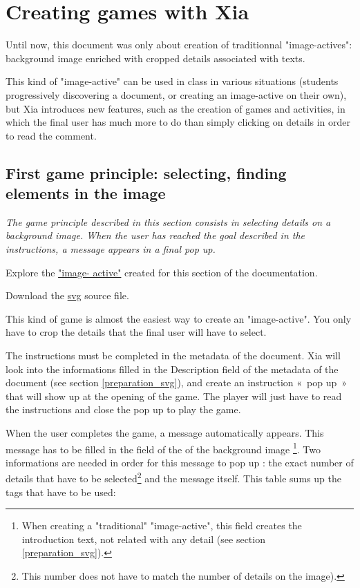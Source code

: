 \section{Creating games with Xia}\label{games_IA}

Until now, this document was only about creation of traditionnal "image-actives": 
background image enriched with cropped details associated with texts.

This kind of "image-active" can be used in class in various situations 
(students progressively discovering a document, or creating an image-active
on their own), but Xia introduces new features, 
such as the creation of games and activities, in which the final user 
has much more to do than simply clicking on details in order to read the comment.

\subsection{First game principle: selecting, finding elements in the image}

\textit{The game principle described in this section consists in selecting details 
on a background image. When the user has reached the goal described in the 
instructions, a message appears in a final pop up.}


\begin{links}
Explore the \href{http://images-actives.crdp-versailles.fr/beta/demo/tuto/xia3}{"image- 
active"} created for this section of the documentation.

Download the \href{http://images-actives.crdp-versailles.fr/beta/demo/tuto/xia3/svg/xia3.svg}{svg} source file.
\end{links}

This kind of game is almost the easiest way to create an "image-active".
You only have to crop the details that the final user will have to select. 

The instructions must be completed in the 
metadata of the document. Xia will look into 
the informations  filled in the  \chemin
{Description} field of the metadata of the document (see section \ref{preparation_svg}), and create an instruction «~pop up~» 
that will show up at the opening of the game. The player will just have to 
read the instructions and close the pop up to play the game.

When the user completes the game, a message automatically appears.  This message 
has to be filled in the  field of the  of the 
background image \footnote{When creating a "traditional" "image-active", 
this field creates the introduction text, not related with any detail 
(see section \ref{preparation_svg}).}. 
Two informations are needed in order for this message to pop up :
the exact number of details that have to be selected\footnote{This number does 
not have to match the number of details on the image).}
and the message itself. This table sums up the tags that have to be used:

